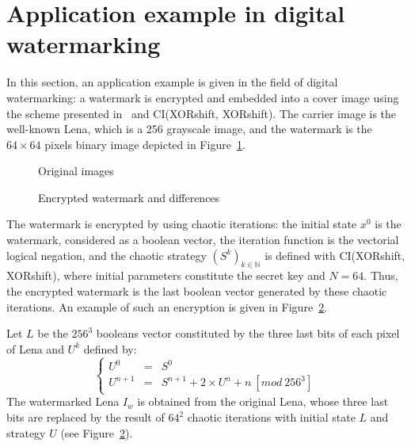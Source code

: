 \documentclass[10pt, a4paper, conference, compsocconf]{IEEEtran}
\begin{document}
\section{Application example in digital watermarking}
\label{An application example of the proposed PRNG}



In this section, an application example is given in the field of digital watermarking: a watermark is encrypted and embedded into a cover image using the scheme presented in~\cite{guyeux10ter} and  CI(XORshift, XORshift). The carrier image is the well-known Lena, which is a 256 grayscale image, and the watermark is the $64\times 64$ pixels binary image depicted in Figure~\ref{Original images}.


\begin{figure}[!t]
\centering
{}
\hfil
{}
\caption{Original images}
\label{Original images}
\end{figure}


\begin{figure}[!t]
\centering
{}
\hfil
{}
\caption{Encrypted watermark and differences}
\label{Encrypted watermark and differences}
\end{figure}

The watermark is encrypted by using chaotic iterations: the initial state $x^{0}$ is the watermark, considered as a boolean vector, the iteration function is the vectorial logical negation, and the chaotic strategy $(S^{k})_{k\in \mathds{N}}$ is defined with CI(XORshift, XORshift), where initial parameters constitute the secret key and $N=64$. Thus, the encrypted watermark is the last boolean vector generated by these chaotic iterations. An example of such an encryption is given in Figure~\ref{Encrypted watermark and differences}.


Let $L$ be the $256^3$ booleans vector constituted by the three last bits of each pixel of Lena and $U^k$ defined by:
\begin{equation}
\left\{ 
\begin{array}{lll}
U^{0} & = & S^{0} \\ 
U^{n+1} & = & S^{n+1}+2\times U^{n}+n ~ [mod ~ 256^3]\end{array}\right.
\end{equation}
The watermarked Lena $I_w$ is obtained from the original Lena, whose three last bits are replaced by the result of $64^2$ chaotic iterations with initial state $L$ and strategy $U$ (see Figure~\ref{Encrypted watermark and differences}).
\end{document}
